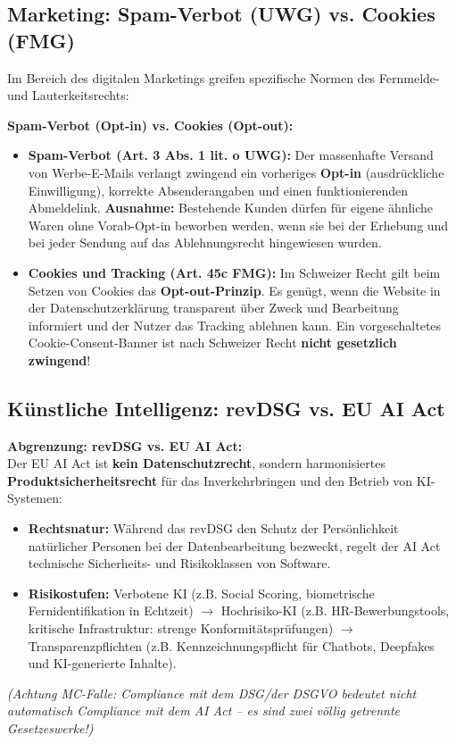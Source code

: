 \subsection{Marketing: Spam-Verbot (UWG) vs. Cookies (FMG)}

Im Bereich des digitalen Marketings greifen spezifische Normen des Fernmelde- und Lauterkeitsrechts:

\begin{definition}
    \textbf{Spam-Verbot (Opt-in) vs. Cookies (Opt-out):}
    \begin{itemize}
        \item \textbf{Spam-Verbot (Art. 3 Abs. 1 lit. o UWG):} Der massenhafte Versand von Werbe-E-Mails verlangt zwingend ein vorheriges \textbf{Opt-in} (ausdrückliche Einwilligung), korrekte Absenderangaben und einen funktionierenden Abmeldelink. \textbf{Ausnahme:} Bestehende Kunden dürfen für eigene ähnliche Waren ohne Vorab-Opt-in beworben werden, wenn sie bei der Erhebung und bei jeder Sendung auf das Ablehnungsrecht hingewiesen wurden.
        \item \textbf{Cookies und Tracking (Art. 45c FMG):} Im Schweizer Recht gilt beim Setzen von Cookies das \textbf{Opt-out-Prinzip}. Es genügt, wenn die Website in der Datenschutzerklärung transparent über Zweck und Bearbeitung informiert und der Nutzer das Tracking ablehnen kann. Ein vorgeschaltetes Cookie-Consent-Banner ist nach Schweizer Recht \textbf{nicht gesetzlich zwingend}!
    \end{itemize}
\end{definition}

\subsection{Künstliche Intelligenz: revDSG vs. EU AI Act}

\begin{remark}
    \textbf{Abgrenzung: revDSG vs. EU AI Act:} \\
    Der EU AI Act ist \textbf{kein Datenschutzrecht}, sondern harmonisiertes \textbf{Produktsicherheitsrecht} für das Inverkehrbringen und den Betrieb von KI-Systemen:
    \begin{itemize}
        \item \textbf{Rechtsnatur:} Während das revDSG den Schutz der Persönlichkeit natürlicher Personen bei der Datenbearbeitung bezweckt, regelt der AI Act technische Sicherheits- und Risikoklassen von Software.
        \item \textbf{Risikostufen:} Verbotene KI (z.B. Social Scoring, biometrische Fernidentifikation in Echtzeit) $\to$ Hochrisiko-KI (z.B. HR-Bewerbungstools, kritische Infrastruktur: strenge Konformitätsprüfungen) $\to$ Transparenzpflichten (z.B. Kennzeichnungspflicht für Chatbots, Deepfakes und KI-generierte Inhalte).
    \end{itemize}
    \textit{(Achtung MC-Falle: Compliance mit dem DSG/der DSGVO bedeutet nicht automatisch Compliance mit dem AI Act -- es sind zwei völlig getrennte Gesetzeswerke!)}
\end{remark}

